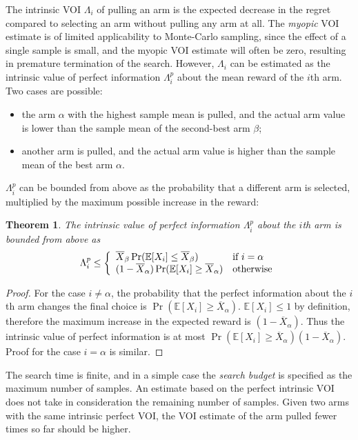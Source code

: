 \documentclass{article}
\newcommand {\IE} {\ensuremath {\mathbb{E}}}
\newtheorem{thm}{Theorem}
\begin{document}
The intrinsic VOI $\Lambda_i$ of pulling an arm is the expected decrease
in the regret compared to selecting an arm without pulling any arm at
all. The \textit{myopic} VOI estimate is of limited applicability to
Monte-Carlo sampling, since the effect of a single sample is small,
and the myopic VOI estimate will often be zero, resulting in premature
termination of the search. However, $\Lambda_i$ can be estimated as the intrinsic 
value of perfect information $\Lambda_i^p$ about the mean reward of the $i$th arm. Two
cases are possible:
\begin{itemize}
\item the arm $\alpha$ with the highest sample mean is pulled, and the 
actual arm value is lower than the sample mean of the second-best arm $\beta$;
\item another arm is pulled, and the actual arm value is higher
than the sample mean of the best arm $\alpha$.
\end{itemize}
$\Lambda_i^p$ can be bounded from above as the probability that a
different arm is selected, multiplied by the
maximum possible increase in the reward:
\begin{thm} The intrinsic value of perfect information $\Lambda_i^p$ about the $i$th arm is
  bounded from above as
\begin{equation}
  \Lambda_i^p \le \left\{
  \begin{array}{l l}
    \overline X_\beta \Pr(\IE[X_i] \le \overline X_\beta) & \mbox{{\rm if} $i=\alpha$} \\
    (1-\overline X_\alpha)\Pr(\IE[X_i] \ge \overline X_\alpha) & \mbox{\rm otherwise}
  \end{array} \right.
\label{eqn:thm-vopi}
\end{equation}
\label{thm:vopi}
\end{thm}

\begin{proof} For the case $i\ne \alpha$, the probability that the perfect
  information about the $i$th arm changes the final choice is
  $\Pr(\IE[X_i] \ge \overline X_\alpha)$. $\IE[X_i] \le 1$ by definition,
  therefore the maximum increase in the expected reward is
  $(1-\overline X_\alpha)$. Thus the intrinsic value of perfect
  information is at most $\Pr(\IE[X_i] \ge \overline
  X_\alpha)(1-\overline X_\alpha)$.
  Proof for the case $i=\alpha$ is similar.
\end{proof}

The search time is finite, and in a simple case the \textit{search
  budget} is specified as the maximum number of samples.
An estimate based on the perfect intrinsic VOI does not take in
consideration the remaining number of samples. Given two arms
with the same intrinsic perfect VOI, the VOI
estimate of the arm pulled fewer times so far should be higher.
\end{document}
